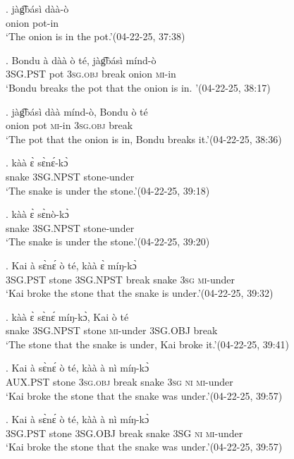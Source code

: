 \documentclass{assets/fieldnotes}
\begin{document}

\exg. jàg͡básì dàà-ò\\
onion pot-in\\
`The onion is in the pot.’\hfill{(04-22-25, 37:38)}

\exg. Bondu à dàà ò té, jàg͡básì mínd-ò\\
{} \textsc{3SG.PST} pot \textsc{3sg.obj} break onion \textsc{mi}-in\\
`Bondu breaks the pot that the onion is in. ’\hfill{(04-22-25, 38:17)}

\exg. jàg͡básì dàà mínd-ò, Bondu ò té\\
onion pot \textsc{mi}-in {} \textsc{3sg.obj} break\\
`The pot that the onion is in, Bondu breaks it.’\hfill{(04-22-25, 38:36)}

\exg. kàà ɛ̀ sɛ̀nɛ́-kɔ̀\\
snake \textsc{3SG.NPST} stone-under\\
`The snake is under the stone.’\hfill{(04-22-25, 39:18)}

\exg. kàà ɛ̀ sɛ̀nò-kɔ̀\\
snake \textsc{3SG.NPST} stone-under\\
`The snake is under the stone.’\hfill{(04-22-25, 39:20)}\\

\exg. Kai à sɛ̀nɛ́ ò té, kàà ɛ̀ míŋ-kɔ̀\\
{} \textsc{3SG.PST} stone \textsc{3SG.NPST} break snake \textsc{3sg} \textsc{mi}-under\\
`Kai broke the stone that the snake is under.’\hfill{(04-22-25, 39:32)}

\exg. kàà ɛ̀ sɛ̀nɛ́ míŋ-kɔ̀, Kai ò té\\
snake \textsc{3SG.NPST} stone \textsc{mi}-under {} \textsc{3SG.OBJ} break \\
`The stone that the snake is under, Kai broke it.’\hfill{(04-22-25, 39:41)}

\exg. Kai à sɛ̀nɛ́ ò té, kàà à nì míŋ-kɔ̀\\
{} \textsc{AUX.PST} stone \textsc{3sg.obj} break snake \textsc{3sg} \textsc{ni} \textsc{mi}-under\\
`Kai broke the stone that the snake was under.’\hfill{(04-22-25, 39:57)}

\exg. Kai à sɛ̀nɛ́ ò té, kàà à nì míŋ-kɔ̀\\
{} \textsc{3SG.PST} stone \textsc{3SG.OBJ} break snake \textsc{3SG} \textsc{ni} \textsc{mi}-under\\
`Kai broke the stone that the snake was under.’\hfill{(04-22-25, 39:57)}
\end{document}
